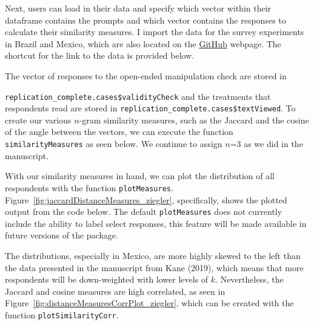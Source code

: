 \documentclass[12pt,letterpaper]{article}
\begin{document}
	  

Next, users can load in their data and specify which vector within their dataframe contains the prompts and which vector contains the responses to calculate their similarity measures. I import the data for the survey experiments in Brazil and Mexico, which are also located on the \href{https://github.com/jeffreyziegler/openEnded}{GitHub} webpage. The shortcut for the link to the data is provided below.



The vector of responses to the open-ended manipulation check are stored in
 
\texttt{\footnotesize replication\_complete.cases\$validityCheck} and the treatments that respondents read are stored in \texttt{\footnotesize replication\_complete.cases\$textViewed}. To create our various $n$-gram similarity measures, such as the Jaccard and the cosine of the angle between the vectors, we can execute the function \texttt{\footnotesize similarityMeasures} as seen below. We continue to assign $n$=3 as we did in the manuscript.



With our similarity measures in hand, we can plot the distribution of all respondents with the function  \texttt{\footnotesize plotMeasures}. Figure~\ref{fig:jaccardDistanceMeasures_ziegler}, specifically, shows the plotted output from the code below. The default \texttt{\footnotesize plotMeasures} does not currently include the ability to label select responses, this feature will be made available in future versions of the package.



The distributions, especially in Mexico, are more highly skewed to the left than the data presented in the manuscript from Kane (2019), which means that more respondents will be down-weighted with lower levels of $k$. Nevertheless, the Jaccard and cosine measures are high correlated, as seen in Figure~\ref{fig:distanceMeasuresCorrPlot_ziegler}, which can be created with the function \texttt{\footnotesize plotSimilarityCorr}.
\end{document}
